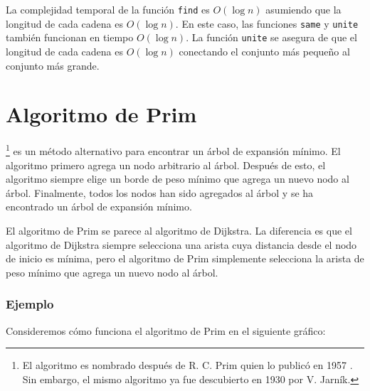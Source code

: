 La complejidad temporal de la función \texttt{find}
es $O(\log n)$ asumiendo que la longitud de cada
cadena es $O(\log n)$.
En este caso, las funciones \texttt{same} y \texttt{unite}
también funcionan en tiempo $O(\log n)$.
La función \texttt{unite} se asegura de que el
longitud de cada cadena es $O(\log n)$ conectando
el conjunto más pequeño al conjunto más grande.

\section{Algoritmo de Prim}


\footnote{El algoritmo es
nombrado después de R. C. Prim quien lo publicó en 1957 \cite{pri57}.
Sin embargo, el mismo algoritmo ya fue descubierto en 1930
por V. Jarník.} es un método alternativo
para encontrar un árbol de expansión mínimo.
El algoritmo primero agrega un nodo arbitrario
al árbol.
Después de esto, el algoritmo siempre elige
un borde de peso mínimo que
agrega un nuevo nodo al árbol.
Finalmente, todos los nodos han sido agregados al árbol
y se ha encontrado un árbol de expansión mínimo.



El algoritmo de Prim se parece al algoritmo de Dijkstra.
La diferencia es que el algoritmo de Dijkstra siempre
selecciona una arista cuya distancia desde el nodo de inicio
es mínima, pero el algoritmo de Prim simplemente selecciona
la arista de peso mínimo que agrega un nuevo nodo al árbol.

\subsubsection{Ejemplo}

Consideremos cómo funciona el algoritmo de Prim
en el siguiente gráfico:

